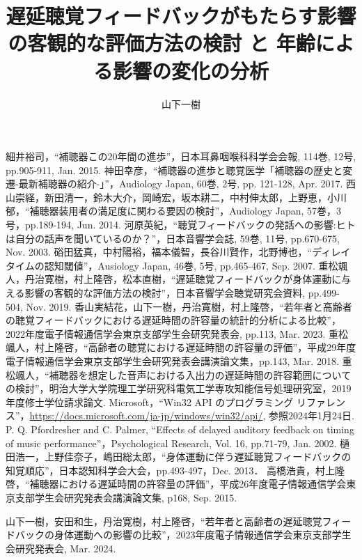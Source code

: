 \documentclass[a4paper,12pt]{jsreport}
\title{遅延聴覚フィードバックがもたらす影響の客観的な評価方法の検討
と
年齢による影響の変化の分析}
\author{山下\hspace{1zw}一樹}%
\begin{document}
\makecover%
\tableofcontents%










\begin{thebibliography}{99}
	細井裕司，``補聴器この20年間の進歩''，日本耳鼻咽喉科科学会会報, 114巻, 12号, pp.905-911, Jan. 2015.
  神田幸彦，``補聴器の進歩と聴覚医学「補聴器の歴史と変遷-最新補聴器の紹介-」''，Audiology Japan, 60巻, 2号, pp. 121-128, Apr. 2017.
  西山崇経，新田清一，鈴木大介，岡崎宏，坂本耕二，中村伸太郎，上野恵，小川郁，``補聴器装用者の満足度に関わる要因の検討''，Audiology Japan, 57巻，3号，pp.189-194, Jun. 2014.
  河原英紀，``聴覚フィードバックの発話への影響:ヒトは自分の話声を聞いているのか？''，日本音響学会誌, 59巻, 11号, pp.670-675, Nov. 2003.
  硲田猛真，中村陽裕，福本儀智，長谷川賢作，北野博也，``ディレイタイムの認知閾値''，Ausiology Japan, 46巻, 5号, pp.465-467, Sep. 2007.
  重松颯人，丹治寛樹，村上隆啓，松本直樹，``遅延聴覚フィードバックが身体運動に与える影響の客観的な評価方法の検討''，日本音響学会聴覚研究会資料, pp.499-504, Nov. 2019.
  香山実結花，山下一樹，丹治寛樹，村上隆啓，``若年者と高齢者の聴覚フィードバックにおける遅延時間の許容量の統計的分析による比較''，2022年度電子情報通信学会東京支部学生会研究発表会, pp.113, Mar. 2023.
  重松颯人，村上隆啓，``高齢者の聴覚における遅延時間の許容量の評価''，平成29年度電子情報通信学会東京支部学生会研究発表会講演論文集，pp.143, Mar. 2018.
  重松颯人，``補聴器を想定した音声における入出力の遅延時間の許容範囲についての検討''，明治大学大学院理工学研究科電気工学専攻知能信号処理研究室，2019年度修士学位請求論文.
  Microsoft，``Win32 API のプログラミング リファレンス''，\url{https://docs.microsoft.com/ja-jp/windows/win32/api/}, 参照2024年1月24日.
  P. Q. Pfordresher and C. Palmer, ``Effects of delayed auditory feedback on timing of music performance''，Psychological Research, Vol. 16, pp.71-79, Jan. 2002.
  樋田浩一，上野佳奈子，嶋田総太郎，``身体運動に伴う遅延聴覚フィードバックの知覚順応''，日本認知科学会大会，pp.493-497，Dec. 2013．
  高橋浩貴，村上隆啓，``補聴器における遅延時間の許容量の評価''，平成26年度電子情報通信学会東京支部学生会研究発表会講演論文集, p168, Sep. 2015.

\end{thebibliography}
\begin{thepublished}{99}
	山下一樹，安田和生，丹治寛樹，村上隆啓，``若年者と高齢者の遅延聴覚フィードバックの身体運動への影響の比較''，2023年度電子情報通信学会東京支部学生会研究発表会, Mar. 2024.
	
\end{thepublished}
\newpage



\appendix
% 
% 
% 
% 
\end{document}
